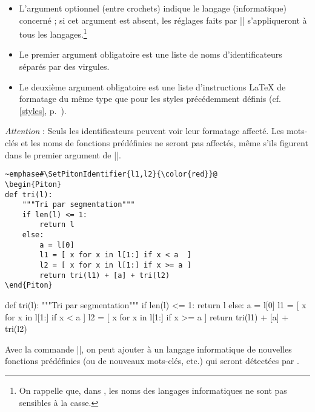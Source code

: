 \documentclass[dvipsnames,svgnames]{article}
\begin{document}
\begin{itemize}
\item L'argument optionnel (entre crochets) indique le langage (informatique) concerné ;
si cet argument est absent, les réglages faits par |\SetPitonIdentifier| s'appliqueront à
tous les langages.\footnote{On rappelle que, dans , les noms des langages
  informatiques ne sont pas sensibles à la casse.}

\item Le premier argument obligatoire est une liste de noms d'identificateurs séparés par
des virgules.

\item Le deuxième argument obligatoire est une liste d'instructions LaTeX de formatage du
même type que pour les styles précédemment définis (cf. \ref{styles},
p.~\pageref{styles}).


\end{itemize}

\emph{Attention} : Seuls les identificateurs peuvent voir leur formatage affecté. Les
mots-clés et les noms de fonctions prédéfinies ne seront pas affectés, même s'ils figurent
dans le premier argument de |\SetPitonIdentifier|.

\begin{Verbatim}
~emphase#\SetPitonIdentifier{l1,l2}{\color{red}}@
\begin{Piton}
def tri(l):
    """Tri par segmentation"""
    if len(l) <= 1:
        return l
    else:
        a = l[0]
        l1 = [ x for x in l[1:] if x < a  ]
        l2 = [ x for x in l[1:] if x >= a ]
        return tri(l1) + [a] + tri(l2)
\end{Piton}
\end{Verbatim}


\bigskip

\begingroup


\begin{Piton}
def tri(l):
    """Tri par segmentation"""
    if len(l) <= 1:
        return l
    else:
        a = l[0]
        l1 = [ x for x in l[1:] if x < a  ]
        l2 = [ x for x in l[1:] if x >= a ]
        return tri(l1) + [a] + tri(l2)
\end{Piton}

\endgroup

\bigskip
Avec la commande |\SetPitonIdentifiers|, on peut ajouter à un langage informatique de
nouvelles fonctions prédéfinies (ou de nouveaux mots-clés, etc.) qui seront détectées par
.
\end{document}
